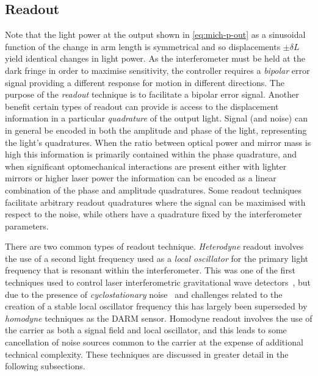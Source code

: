 \subsection{\label{sec:readout}Readout}
Note that the light power at the output shown in \cref{eq:mich-p-out} as a sinusoidal function of the change in arm length is symmetrical and so displacements $\pm \delta L$ yield identical changes in light power. As the interferometer must be held at the dark fringe in order to maximise sensitivity, the controller requires a \emph{bipolar} error signal providing a different response for motion in different directions. The purpose of the \emph{readout} technique is to facilitate a bipolar error signal. Another benefit certain types of readout can provide is access to the displacement information in a particular \emph{quadrature} of the output light. Signal (and noise) can in general be encoded in both the amplitude and phase of the light, representing the light's quadratures. When the ratio between optical power and mirror mass is high this information is primarily contained within the phase quadrature, and when significant optomechanical interactions are present either with lighter mirrors or higher laser power the information can be encoded as a linear combination of the phase and amplitude quadratures. Some readout techniques facilitate arbitrary readout quadratures where the signal can be maximised with respect to the noise, while others have a quadrature fixed by the interferometer parameters.

There are two common types of readout technique. \emph{Heterodyne} readout involves the use of a second light frequency used as a \emph{local oscillator} for the primary light frequency that is resonant within the interferometer. This was one of the first techniques used to control laser interferometric gravitational wave detectors~\cite{Willke2002}, but due to the presence of \emph{cyclostationary} noise~\cite{Niebauer1991} and challenges related to the creation of a stable local oscillator frequency this has largely been superseded by \emph{homodyne} techniques as the \gls{DARM} sensor. Homodyne readout involves the use of the carrier as both a signal field and local oscillator, and this leads to some cancellation of noise sources common to the carrier at the expense of additional technical complexity. These techniques are discussed in greater detail in the following subsections.


